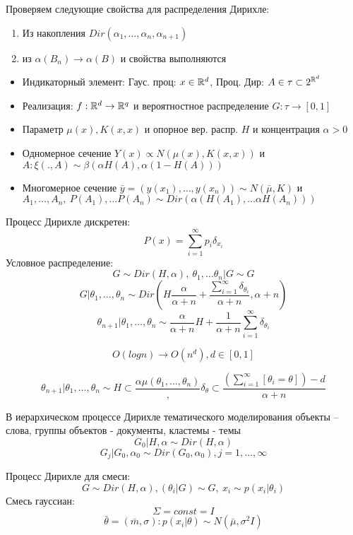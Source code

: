 Проверяем следующие свойства для распределения Дирихле:
\begin{enumerate}
	\item Из накопления $Dir(\alpha_1, \ldots, \alpha_n, \alpha_{n+1})$
	\item из $\alpha(B_n) \to \alpha(B)$ и свойства выполняются
\end{enumerate}

\begin{itemize}
	\item Индикаторный элемент: Гаус. проц: $x \in \mathbb{R}^d$, Проц. Дир: $A \in \tau \subset 2^{\mathbb{R}^d}$
	\item Реализация: $f: \mathbb{R}^d \to \mathbb{R}^q$ и вероятностное распределение $ G: \tau  \to [0,1]$
	\item Параметр $ \mu(x), K(x, x)$ и опорное вер. распр. $H$ и концентрация $\alpha>0$
	\item Одномерное сечение $Y(x) \propto N(\mu(x), K(x,x))$ и $A: \xi(., A) \sim \beta(\alpha H(A), \alpha (1-H(A)))$
	\item Многомерное сечение $\bar{y} = (y(x_1), \ldots, y(x_n)) \sim N(\bar{\mu}, K)$ и $ A_1, \ldots, A_n, \ P(A_1), \ldots P(A_n) \sim Dir(\alpha(H(A_1), \ldots \alpha H(A_n))) $
\end{itemize}

Процесс Дирихле дискретен: $$ P(x) = \sum_{i=1}^\infty p_i \delta_{x_i} $$
Условное распределение: $$ G \sim Dir(H, \alpha), \ \theta_1, \ldots \theta_n | G \sim G $$
$$ G | \theta_1, \ldots, \theta_n \sim Dir(H \frac{\alpha}{\alpha + n} + \frac{\sum_{i=1}^\infty \delta_{\theta_i}}{\alpha+n}, \alpha+n) $$
$$ \theta_{n+1} | \theta_1, \ldots, \theta_n \sim \frac{\alpha}{\alpha+n}H + \frac{1}{\alpha+n} \sum_{i=1}^\infty \delta_{\theta_i}$$


$$ O(log n) \to O(n^d), d \in [0,1] $$

$$ \theta_{n+1} | \theta_1, \ldots, \theta_n \sim H \subset \frac{\alpha\mu(\theta_1, \ldots, \theta_n)} , \delta_{\theta} \subset \frac{(\sum_{i=1}^\infty[\theta_i = \theta]) - d}{\alpha+n}$$

В иерархическом процессе Дирихле тематического моделирования объекты – слова, группы объектов - документы, кластемы - темы
$$ G_0 | H, \alpha \sim Dir(H, \alpha) $$
$$ G_j | G_0, \alpha_0 \sim Dir(G_0, \alpha_0), j=1, \ldots, \infty $$

Процесс Дирихле для смеси:
$$ G \sim Dir(H, \alpha), (\theta_i|G) \sim G, \ x_i \sim p(x_i|\theta_i) $$
Смесь гауссиан:
$$ \Sigma = const = I $$
$$ \bar{\theta} = (\bar{m}, \sigma): p(x_i|\theta) \sim N(\bar{\mu}, \sigma^2I) $$

